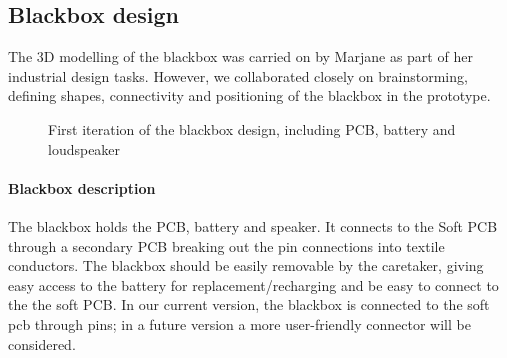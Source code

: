 \subsection{Blackbox design}
The 3D modelling of the blackbox was carried on by Marjane as part of her industrial design tasks. However, we collaborated closely on brainstorming, defining shapes, connectivity and positioning of the blackbox in the prototype. 

\begin{figure}[ht]
    \centering
    \hfill
    \hfill
    \caption{First iteration of the blackbox design, including PCB, battery and loudspeaker}
    \label{fig:blackbox}
\end{figure}

\paragraph{Blackbox description} The blackbox holds the PCB, battery and speaker. It connects
to the Soft PCB through a secondary PCB breaking out the pin connections into textile conductors. The blackbox should be easily removable by the caretaker, giving easy access to the battery for replacement/recharging and be easy to connect to the the soft PCB. In our current version, the blackbox is connected to the soft pcb through pins; in a future version a more user-friendly connector will be considered.

